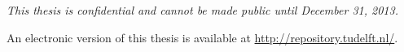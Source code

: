 \begin{titlepage}
\begin{center}
        \bigskip
        \bigskip
        \emph{This thesis is confidential and cannot be made public until December 31, 2013.}

        \bigskip
        \bigskip
        An electronic version of this thesis is available at \url{http://repository.tudelft.nl/}.

    \end{center}

\end{titlepage}

